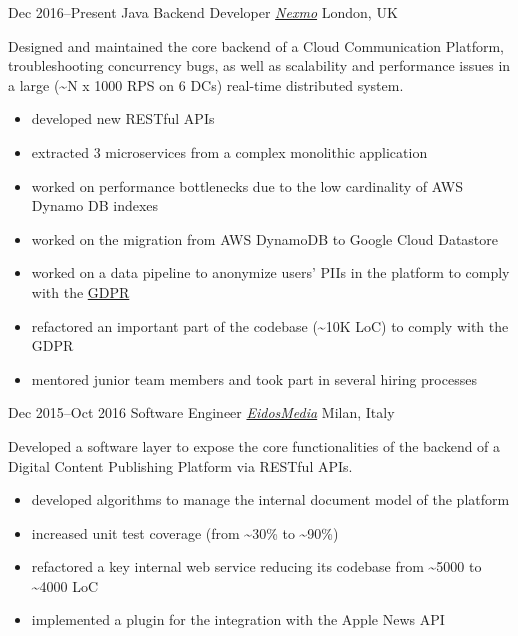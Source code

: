\begin{entrylist}
\entry
{Dec 2016--Present}
{Java Backend Developer {\normalfont \emph{\href{https://www.nexmo.com/}{Nexmo}}}}
{London, UK}
{Designed and maintained the core backend of a Cloud Communication Platform, troubleshooting concurrency bugs, as well as scalability and performance issues in a large (\textasciitilde N x 1000 RPS on 6 DCs) real-time distributed system.
\vspace{-.2cm}
\begin{itemize}[leftmargin=.6cm]
	\item developed new RESTful APIs  
	\item extracted 3 microservices from a complex monolithic application
	\item worked on performance bottlenecks due to the low cardinality of AWS Dynamo DB indexes
	\item worked on the migration from AWS DynamoDB to Google Cloud Datastore
	\item worked on a data pipeline to anonymize users' PIIs in the platform to comply with the \href{https://en.wikipedia.org/wiki/General_Data_Protection_Regulation}{GDPR}
	\item refactored an important part of the codebase (\textasciitilde 10K LoC) to comply with the GDPR
	\item mentored junior team members and took part in several hiring processes
\end{itemize}
}

\entry
{Dec 2015--Oct 2016}
{Software Engineer {\normalfont \emph{\href{https://www.eidosmedia.com/}{EidosMedia}}}}
{Milan, Italy}
{Developed a software layer to expose the core functionalities of the backend of a Digital Content Publishing Platform via RESTful APIs.  
\vspace{-.2cm}
\begin{itemize}[leftmargin=.6cm] 
	\item developed algorithms to manage the internal document model of the platform
	\item increased unit test coverage (from \textasciitilde 30\% to \textasciitilde 90\%)
	\item refactored a key internal web service reducing its codebase from \textasciitilde 5000 to \textasciitilde 4000 LoC
	\item implemented a plugin for the integration with the Apple News API 
\end{itemize}
}


\end{entrylist}
